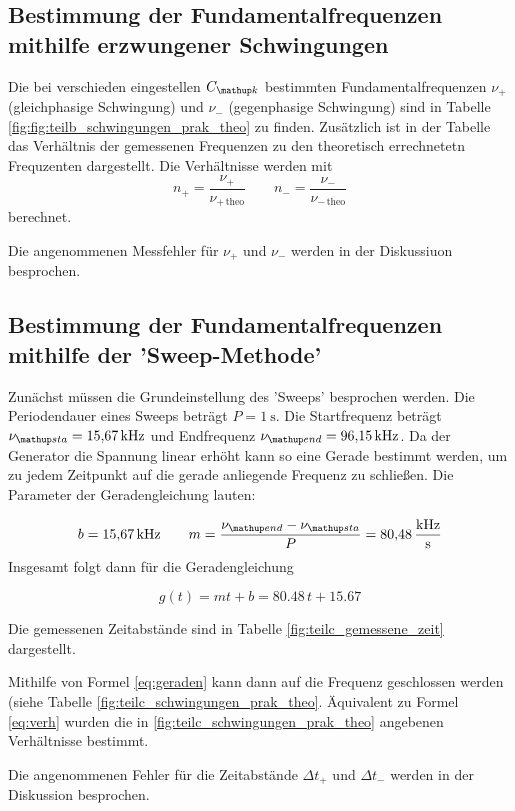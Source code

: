 \subsection{Bestimmung der Fundamentalfrequenzen mithilfe erzwungener Schwingungen}
Die bei verschieden eingestellen $C\ua{k}$ bestimmten Fundamentalfrequenzen 
$\nu_+$ (gleichphasige Schwingung) und $\nu_-$ (gegenphasige Schwingung)
sind in Tabelle \ref{fig:fig:teilb_schwingungen_prak_theo} zu finden.
Zusätzlich ist in der Tabelle das Verhältnis der gemessenen Frequenzen 
zu den theoretisch errechnetetn Frequzenten dargestellt.
Die Verhältnisse werden mit
\begin{equation}
\label{eq:verh}
n_+=\frac{\nu_+}{\nu_{+\,\mathup{theo}}} \qquad n_-=\frac{\nu_-}{\nu_{-\,\mathup{theo}}}
\end{equation}
berechnet.
\FloatBarrier

\FloatBarrier
Die angenommenen Messfehler für $\nu_+$ und $\nu_-$ werden in der Diskussiuon besprochen.

\subsection{Bestimmung der Fundamentalfrequenzen mithilfe der 'Sweep-Methode'}
Zunächst müssen die Grundeinstellung des 'Sweeps' besprochen werden.
Die Periodendauer eines Sweeps beträgt $P=\SI{1}{\second}$.
Die Startfrequenz beträgt $\nu\ua{sta}=\SI{15.67}{\kilo\hertz}$ und 
Endfrequenz $\nu\ua{end}=\SI{96.15}{\kilo\hertz}$.
Da der Generator die Spannung linear erhöht kann so eine Gerade bestimmt werden, um 
zu jedem Zeitpunkt auf die gerade anliegende Frequenz zu schließen.
Die Parameter der Geradengleichung lauten:

\begin{equation*}
b=\SI{15.67}{\kilo\hertz} \qquad m=\frac{\nu\ua{end}-\nu\ua{sta}}{P}=\SI{80.48}{\kilo\hertz\per\second}
\end{equation*}
Insgesamt folgt dann für die Geradengleichung

\begin{equation}
\label{eq:geraden}
g(t)=mt+b=80.48\,t+15.67
\end{equation}

Die gemessenen Zeitabstände sind in Tabelle \ref{fig:teilc_gemessene_zeit} dargestellt.


Mithilfe von Formel \eqref{eq:geraden} kann dann auf die Frequenz geschlossen werden (siehe Tabelle \ref{fig:teilc_schwingungen_prak_theo}.
Äquivalent zu Formel \eqref{eq:verh} wurden die in \ref{fig:teilc_schwingungen_prak_theo} angebenen Verhältnisse bestimmt.

Die angenommenen Fehler für die Zeitabstände $\Delta t_+$ und $\Delta t_-$ werden in der Diskussion besprochen.